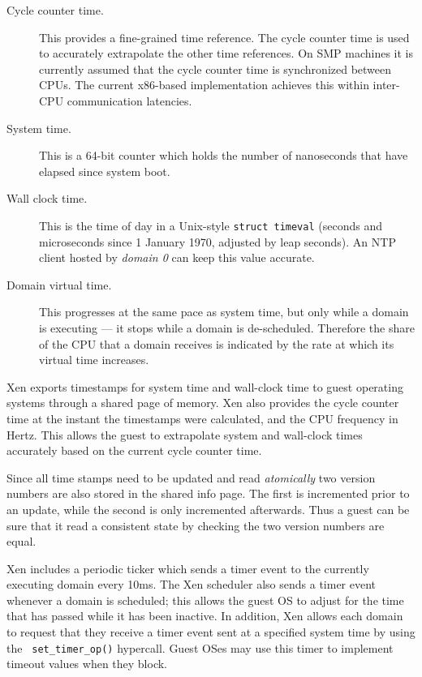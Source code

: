 \documentclass[11pt,twoside,final,openright]{xenstyle}
\begin{document}
\begin{description}
\item[Cycle counter time.]

This provides a fine-grained time reference.  The cycle counter time is
used to accurately extrapolate the other time references.  On SMP machines
it is currently assumed that the cycle counter time is synchronized between
CPUs.  The current x86-based implementation achieves this within inter-CPU
communication latencies.

\item[System time.]

This is a 64-bit counter which holds the number of nanoseconds that
have elapsed since system boot.


\item[Wall clock time.]

This is the time of day in a Unix-style {\tt struct timeval} (seconds
and microseconds since 1 January 1970, adjusted by leap seconds).  An
NTP client hosted by {\it domain 0} can keep this value accurate.  


\item[Domain virtual time.]

This progresses at the same pace as system time, but only while a
domain is executing --- it stops while a domain is de-scheduled.
Therefore the share of the CPU that a domain receives is indicated by
the rate at which its virtual time increases.

\end{description}


Xen exports timestamps for system time and wall-clock time to guest
operating systems through a shared page of memory.  Xen also provides
the cycle counter time at the instant the timestamps were calculated,
and the CPU frequency in Hertz.  This allows the guest to extrapolate
system and wall-clock times accurately based on the current cycle
counter time.

Since all time stamps need to be updated and read \emph{atomically}
two version numbers are also stored in the shared info page. The 
first is incremented prior to an update, while the second is only
incremented afterwards. Thus a guest can be sure that it read a consistent 
state by checking the two version numbers are equal. 

Xen includes a periodic ticker which sends a timer event to the
currently executing domain every 10ms.  The Xen scheduler also sends a
timer event whenever a domain is scheduled; this allows the guest OS
to adjust for the time that has passed while it has been inactive.  In
addition, Xen allows each domain to request that they receive a timer
event sent at a specified system time by using the {\tt
set\_timer\_op()} hypercall.  Guest OSes may use this timer to
implement timeout values when they block.
\end{document}
